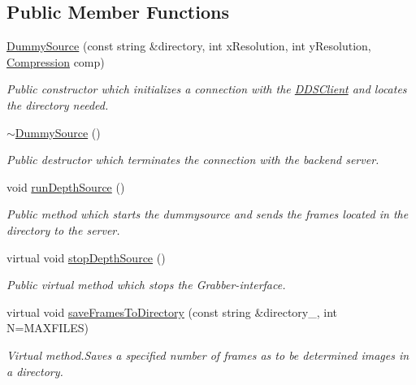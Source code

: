\subsection*{Public Member Functions}
\begin{DoxyCompactItemize}
\item 
\hyperlink{class_dummy_source_a0909293c8d1f641619b0041e84adc06b}{Dummy\+Source} (const string \&directory, int x\+Resolution, int y\+Resolution, \hyperlink{_compression_strategy_8h_a56a83bf6847f4801f4205eb4be237ccf}{Compression} comp)
\begin{DoxyCompactList}\small\item\em Public constructor which initializes a connection with the \hyperlink{class_d_d_s_client}{D\+D\+S\+Client} and locates the directory needed. \end{DoxyCompactList}\item 
\hypertarget{class_dummy_source_a028993d5099e07fd5bde0b80dfd593bc}{\hyperlink{class_dummy_source_a028993d5099e07fd5bde0b80dfd593bc}{$\sim$\+Dummy\+Source} ()}\label{class_dummy_source_a028993d5099e07fd5bde0b80dfd593bc}

\begin{DoxyCompactList}\small\item\em Public destructor which terminates the connection with the backend server. \end{DoxyCompactList}\item 
\hypertarget{class_dummy_source_a93b6a46c6fc3b71488578b0bf1665bb6}{void \hyperlink{class_dummy_source_a93b6a46c6fc3b71488578b0bf1665bb6}{run\+Depth\+Source} ()}\label{class_dummy_source_a93b6a46c6fc3b71488578b0bf1665bb6}

\begin{DoxyCompactList}\small\item\em Public method which starts the dummysource and sends the frames located in the directory to the server. \end{DoxyCompactList}\item 
\hypertarget{class_dummy_source_a68186d8b68fac14eaaf764a50addbf14}{virtual void \hyperlink{class_dummy_source_a68186d8b68fac14eaaf764a50addbf14}{stop\+Depth\+Source} ()}\label{class_dummy_source_a68186d8b68fac14eaaf764a50addbf14}

\begin{DoxyCompactList}\small\item\em Public virtual method which stops the Grabber-\/interface. \end{DoxyCompactList}\item 
virtual void \hyperlink{class_dummy_source_af49cb371ea7e0eca894d1cdc26749f3f}{save\+Frames\+To\+Directory} (const string \&directory\+\_\+, int N=M\+A\+X\+F\+I\+L\+E\+S)
\begin{DoxyCompactList}\small\item\em Virtual method.\+Saves a specified number of frames as to be determined images in a directory. \end{DoxyCompactList}\end{DoxyCompactItemize}
